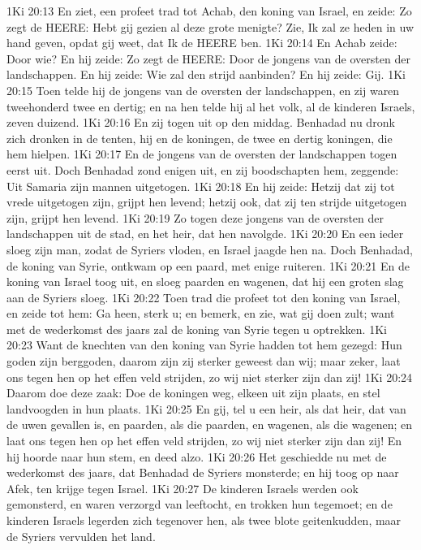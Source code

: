 1Ki 20:13  En ziet, een profeet trad tot Achab, den koning van Israel, en zeide: Zo zegt de HEERE: Hebt gij gezien al deze grote menigte? Zie, Ik zal ze heden in uw hand geven, opdat gij weet, dat Ik de HEERE ben.
1Ki 20:14  En Achab zeide: Door wie? En hij zeide: Zo zegt de HEERE: Door de jongens van de oversten der landschappen. En hij zeide: Wie zal den strijd aanbinden? En hij zeide: Gij.
1Ki 20:15  Toen telde hij de jongens van de oversten der landschappen, en zij waren tweehonderd twee en dertig; en na hen telde hij al het volk, al de kinderen Israels, zeven duizend.
1Ki 20:16  En zij togen uit op den middag. Benhadad nu dronk zich dronken in de tenten, hij en de koningen, de twee en dertig koningen, die hem hielpen.
1Ki 20:17  En de jongens van de oversten der landschappen togen eerst uit. Doch Benhadad zond enigen uit, en zij boodschapten hem, zeggende: Uit Samaria zijn mannen uitgetogen.
1Ki 20:18  En hij zeide: Hetzij dat zij tot vrede uitgetogen zijn, grijpt hen levend; hetzij ook, dat zij ten strijde uitgetogen zijn, grijpt hen levend.
1Ki 20:19  Zo togen deze jongens van de oversten der landschappen uit de stad, en het heir, dat hen navolgde.
1Ki 20:20  En een ieder sloeg zijn man, zodat de Syriers vloden, en Israel jaagde hen na. Doch Benhadad, de koning van Syrie, ontkwam op een paard, met enige ruiteren.
1Ki 20:21  En de koning van Israel toog uit, en sloeg paarden en wagenen, dat hij een groten slag aan de Syriers sloeg.
1Ki 20:22  Toen trad die profeet tot den koning van Israel, en zeide tot hem: Ga heen, sterk u; en bemerk, en zie, wat gij doen zult; want met de wederkomst des jaars zal de koning van Syrie tegen u optrekken.
1Ki 20:23  Want de knechten van den koning van Syrie hadden tot hem gezegd: Hun goden zijn berggoden, daarom zijn zij sterker geweest dan wij; maar zeker, laat ons tegen hen op het effen veld strijden, zo wij niet sterker zijn dan zij!
1Ki 20:24  Daarom doe deze zaak: Doe de koningen weg, elkeen uit zijn plaats, en stel landvoogden in hun plaats.
1Ki 20:25  En gij, tel u een heir, als dat heir, dat van de uwen gevallen is, en paarden, als die paarden, en wagenen, als die wagenen; en laat ons tegen hen op het effen veld strijden, zo wij niet sterker zijn dan zij! En hij hoorde naar hun stem, en deed alzo.
1Ki 20:26  Het geschiedde nu met de wederkomst des jaars, dat Benhadad de Syriers monsterde; en hij toog op naar Afek, ten krijge tegen Israel.
1Ki 20:27  De kinderen Israels werden ook gemonsterd, en waren verzorgd van leeftocht, en trokken hun tegemoet; en de kinderen Israels legerden zich tegenover hen, als twee blote geitenkudden, maar de Syriers vervulden het land.

